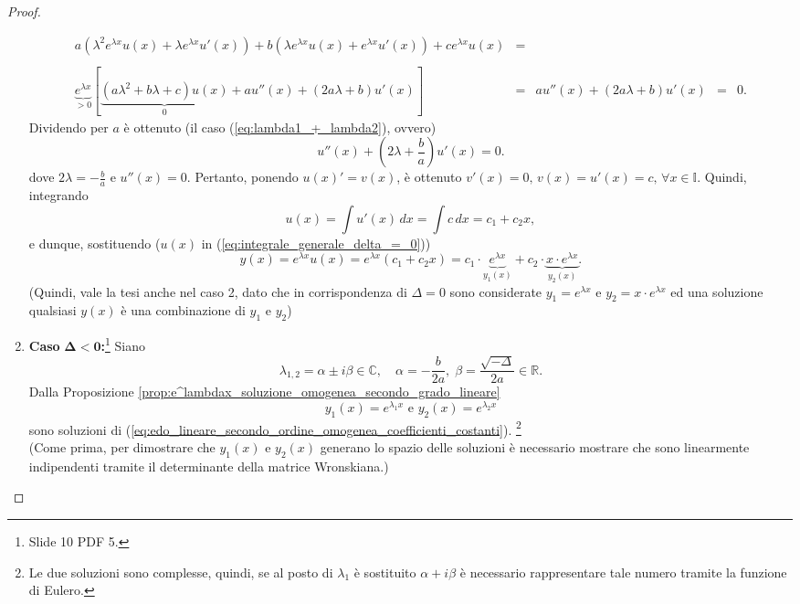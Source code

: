 \begin{proof}
\begin{enumerate}
\begin{equation*}
\begin{matrix}
				a(\lambda^2e^{\lambda x} u(x) + \lambda e ^{\lambda x}u'(x)) + b(\lambda e^{\lambda x}u(x) + e^{\lambda x}u'(x)) + ce^{\lambda x}u(x) &=&\\\\
				\underbrace{e^{\lambda x}}_{>0} [\underbrace{(a\lambda^2+b\lambda +c) u(x)}_{0} + a u''(x)+(2a\lambda + b)u'(x)] &=& a u''(x)+(2a\lambda + b)u'(x) &=& 0.
			\end{matrix}
		\end{equation*}
		Dividendo per $a$ è ottenuto (il caso (\ref{eq:lambda1_+_lambda2}), ovvero)
		\begin{equation*}
			u''(x)+\left(2\lambda + \frac{b}{a}\right)u'(x)=0.
		\end{equation*}
		dove $2\lambda = -\frac{b}{a}$ e $u''(x)=0$.
		Pertanto, ponendo $u(x)'=v(x)$, è ottenuto $v'(x)=0,\,v(x)=u'(x)=c,\,\forall x\in\mathbb{I}$. Quindi, integrando
		\begin{equation*}
			u(x) = \int u'(x)\,dx = \int c\, dx =  c_1+c_2 x,
		\end{equation*}
		e dunque, sostituendo ($u(x)$ in (\ref{eq:integrale_generale_delta_=_0}))
		\begin{equation*}
			y(x) = e^{\lambda x}u(x) = e^{\lambda x} (c_1+c_2x) = c_1\cdot \underbrace{e^{\lambda x}}_{y_1(x)} + c_2\cdot\underbrace{x\cdot e^{\lambda x}}_{y_2(x)}.
		\end{equation*}
		(Quindi, vale la tesi anche nel caso 2, dato che in corrispondenza di $\Delta=0$ sono considerate $y_1=e^{\lambda x}$ e $y_2=x\cdot e^{\lambda x}$ ed una soluzione qualsiasi $y(x)$ è una combinazione di $y_1$ e $y_2$)
		\item \textbf{Caso} $\boldsymbol{\Delta<0}$\textbf{:}\footnote{Slide 10 PDF 5.} Siano
		\begin{equation*}
			\lambda_{1,2}=\alpha\pm i\beta\in\mathbb{C},\quad \alpha=-\frac{b}{2a},\;\beta = \frac{\sqrt{-\Delta}}{2a}\in\mathbb{R}.
		\end{equation*}
		Dalla Proposizione \ref{prop:e^lambdax_soluzione_omogenea_secondo_grado_lineare}
		\begin{equation*}
			y_1(x) = e^{\lambda_1 x} \text{ e } y_2(x)=e^{\lambda_2 x}
		\end{equation*}
		sono soluzioni di (\ref{eq:edo_lineare_secondo_ordine_omogenea_coefficienti_costanti}). \footnote{Le due soluzioni sono complesse, quindi, se al posto di $\lambda_1$ è sostituito $\alpha + i\beta$ è necessario rappresentare tale numero tramite la funzione di Eulero.}\\
		(Come prima, per dimostrare che $y_1(x) \text{ e } y_2(x)$ generano lo spazio delle soluzioni è necessario mostrare che sono linearmente indipendenti tramite il determinante della matrice Wronskiana.)
		

\end{enumerate}
\end{proof}
